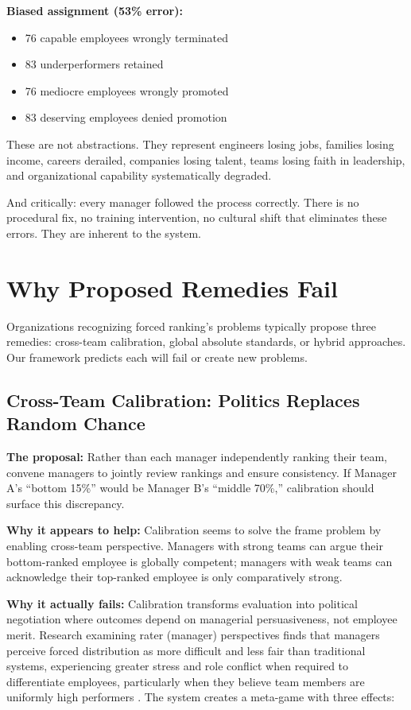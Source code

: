 \documentclass[12pt]{article}
\begin{document}
\textbf{Biased assignment (53\% error):}
\begin{itemize}
\item 76 capable employees wrongly terminated
\item 83 underperformers retained
\item 76 mediocre employees wrongly promoted
\item 83 deserving employees denied promotion
\end{itemize}

These are not abstractions. They represent engineers losing jobs, families losing income, careers derailed, companies losing talent, teams losing faith in leadership, and organizational capability systematically degraded.

And critically: every manager followed the process correctly. There is no procedural fix, no training intervention, no cultural shift that eliminates these errors. They are inherent to the system.

\section{Why Proposed Remedies Fail}

Organizations recognizing forced ranking's problems typically propose three remedies: cross-team calibration, global absolute standards, or hybrid approaches. Our framework predicts each will fail or create new problems.

\subsection{Cross-Team Calibration: Politics Replaces Random Chance}

\textbf{The proposal:} Rather than each manager independently ranking their team, convene managers to jointly review rankings and ensure consistency. If Manager A's ``bottom 15\%'' would be Manager B's ``middle 70\%,'' calibration should surface this discrepancy.

\textbf{Why it appears to help:} Calibration seems to solve the frame problem by enabling cross-team perspective. Managers with strong teams can argue their bottom-ranked employee is globally competent; managers with weak teams can acknowledge their top-ranked employee is only comparatively strong.

\textbf{Why it actually fails:} Calibration transforms evaluation into political negotiation where outcomes depend on managerial persuasiveness, not employee merit. Research examining rater (manager) perspectives finds that managers perceive forced distribution as more difficult and less fair than traditional systems, experiencing greater stress and role conflict when required to differentiate employees, particularly when they believe team members are uniformly high performers \citep{schleicher2009rater}. The system creates a meta-game with three effects:
\end{document}
